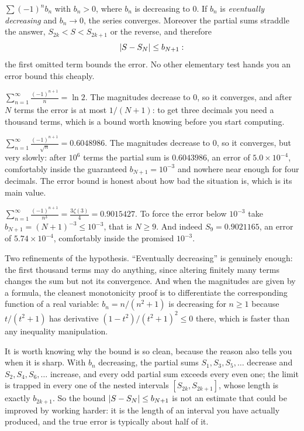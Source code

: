 \cue $\sum(-1)^{n}b_n$ with $b_n>0$, where $b_n$ is decreasing to $0$.
\method If $b_n$ is \emph{eventually decreasing} and $b_n\to0$, the series converges. Moreover the partial sums straddle the answer, $S_{2k}<S<S_{2k+1}$ or the reverse, and therefore
\[\left\lvert S-S_N\right\rvert\leq b_{N+1}:\]
the first omitted term bounds the error. No other elementary test hands you an error bound this cheaply.

\begin{worked}
$\displaystyle\sum_{n=1}^{\infty}\frac{(-1)^{n+1}}{n}=\ln2$. The magnitudes decrease to $0$, so it converges, and after $N$ terms the error is at most $1/(N+1)$: to get three decimals you need a thousand terms, which is a bound worth knowing before you start computing.

$\displaystyle\sum_{n=1}^{\infty}\frac{(-1)^{n+1}}{\sqrt{n}}=0.6048986$. The magnitudes decrease to $0$, so it converges, but very slowly: after $10^{6}$ terms the partial sum is $0.6043986$, an error of $5.0\times10^{-4}$, comfortably inside the guaranteed $b_{N+1}=10^{-3}$ and nowhere near enough for four decimals. The error bound is honest about how bad the situation is, which is its main value.

$\displaystyle\sum_{n=1}^{\infty}\frac{(-1)^{n+1}}{n^{3}}=\frac{3\zeta(3)}{4}=0.9015427$. To force the error below $10^{-3}$ take $b_{N+1}=(N+1)^{-3}\leq10^{-3}$, that is $N\geq9$. And indeed $S_9=0.9021165$, an error of $5.74\times10^{-4}$, comfortably inside the promised $10^{-3}$.
\end{worked}

Two refinements of the hypothesis. ``Eventually decreasing'' is genuinely enough: the first thousand terms may do anything, since altering finitely many terms changes the sum but not its convergence. And when the magnitudes are given by a formula, the cleanest monotonicity proof is to differentiate the corresponding function of a real variable: $b_n=n/(n^2+1)$ is decreasing for $n\geq1$ because $t/(t^2+1)$ has derivative $(1-t^2)/(t^2+1)^2\leq0$ there, which is faster than any inequality manipulation.

It is worth knowing why the bound is so clean, because the reason also tells you when it is sharp. With $b_n$ decreasing, the partial sums $S_1,S_3,S_5,\ldots$ decrease and $S_2,S_4,S_6,\ldots$ increase, and every odd partial sum exceeds every even one; the limit is trapped in every one of the nested intervals $[S_{2k},S_{2k+1}]$, whose length is exactly $b_{2k+1}$. So the bound $\left\lvert S-S_N\right\rvert\leq b_{N+1}$ is not an estimate that could be improved by working harder: it is the length of an interval you have actually produced, and the true error is typically about half of it.

